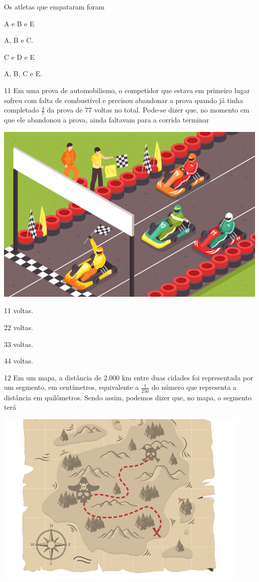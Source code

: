 Os atletas que empataram foram

\begin{multicols}{2}
\begin{escolha}
\item
  A e B e E
\item
  A, B e C.
\item
  C e D e E
\item
  A, B, C e E.
\end{escolha}
\end{multicols}

\num{11} Em uma prova de automobilismo, o competidor que estava em primeiro lugar
sofreu com falta de combustível e precisou abandonar a prova quando já
tinha completado $\frac{4}{7}$ da prova de 77 voltas no total. Pode-se dizer que,
no momento em que ele abandonou a prova, ainda faltavam para a corrida
terminar

\vspace{2em}
\begin{center}
\includegraphics[width=.7\textwidth]{media/image88a.jpeg}
\end{center}

\pagebreak
\begin{escolha}
\item
  11 voltas.
\item
  22 voltas.
\item
  33 voltas.
\item
  44 voltas.
\end{escolha}


\num{12} Em um mapa, a distância de 2.000 km entre duas cidades foi representada
por um segmento, em centímetros, equivalente a $\frac{1}{250}$ do número que
representa a distância em quilômetros. Sendo assim, podemos dizer que, no
mapa, o segmento terá

\vspace{2em}
\includegraphics[width=.8\textwidth]{media/image88b.png}


